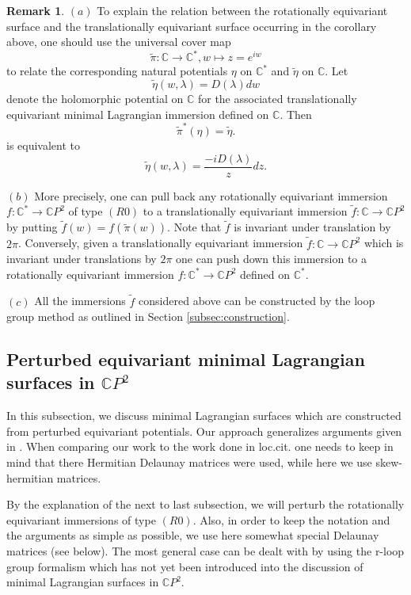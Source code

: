 \documentclass[a4paper,11pt]{amsart}
\theoremstyle{definition}
\newtheorem{remark}{Remark}
\numberwithin{equation}{section}
\newcommand{\C}{\mathbb{C}}
\begin{document}
\begin{remark}
$(a)$ To explain the relation between the rotationally equivariant surface and the translationally equivariant surface occurring in the corollary above, one should use the  universal cover map
$$\tilde{\pi} : \C \rightarrow \C^*,  w\mapsto z=e^{iw}$$
to relate the corresponding natural potentials
$\eta $ on $\C^*$ and $\tilde{\eta}$ on $\C$.
Let  
$$\tilde{\eta}(w, \lambda) =  D(\lambda) dw$$ 
denote the holomorphic potential on $\C$ for the 
 associated  translationally equivariant minimal Lagrangian immersion defined on $\C$. Then
$$ \tilde{\pi}^*(\eta) = \tilde{\eta}.$$
is equivalent  to  
$$\tilde{\eta}(w, \lambda) =  \frac{-i D(\lambda)}{z} dz.$$ 

$(b)$ More precisely, one can pull back any rotationally equivariant immersion
 $f: \C^* \rightarrow \C P^2$ 
of type $(R0)$ to a translationally equivariant immersion $ \tilde{f}: \C \rightarrow \C P^2$ 
by putting $\tilde{f}(w) = f(\tilde{\pi }(w))$. 
Note that $\tilde{f}$ is invariant under translation by $2 \pi$.
Conversely, given a translationally equivariant immersion $ \tilde{f}: \C \rightarrow \C P^2$ 
which is invariant under translations by $2 \pi$ one can push down this immersion to a
rotationally  equivariant immersion  $f: \C^* \rightarrow \C P^2$  defined on $\C^*$.

$(c)$ All the immersions  $\tilde{f}$ considered above can be constructed by the loop group method 
as outlined in Section \ref{subsec:construction}.
\end{remark}




\subsection{Perturbed equivariant minimal Lagrangian surfaces in \texorpdfstring{$\C P^2$}{}}

In this subsection, we discuss minimal Lagrangian surfaces which are constructed 
from perturbed equivariant potentials.
Our approach generalizes arguments given in \cite{DW08}.
When comparing our work to the work done in loc.cit. one needs to keep in mind that 
there Hermitian Delaunay matrices were used, while here we use skew-hermitian matrices.

By the explanation of the next to  last subsection, we will perturb the  rotationally 
equivariant immersions of type $(R0)$.
Also, in order to keep the notation and the arguments as simple as possible, 
we use here somewhat special Delaunay matrices (see below).
The most general case can be dealt with by using the r-loop group formalism which has not 
yet been introduced into the discussion of minimal Lagrangian surfaces in $\C P^2$.
\end{document}
